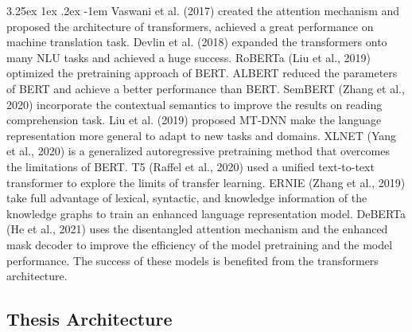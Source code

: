 \documentclass[12pt]{article}
\makeatletter
\renewcommand\paragraph{\@startsection{paragraph}{5}{\z@}%
  {3.25ex \@plus1ex \@minus.2ex}%
  {-1em}%
  {\normalfont\normalsize\bfseries}}
\makeatother
\begin{document}
\begin{CJK*}{UTF8}{bkai}
\begin{spacing}{1.77}
\paragraph{}
Vaswani et al. (2017)\cite{vaswani2017attention} created the attention mechanism and proposed the architecture of transformers, achieved a great performance on machine translation task. Devlin et al. (2018)\cite{devlin2018bert} expanded the transformers onto many NLU tasks and achieved a huge success. RoBERTa (Liu et al., 2019)\cite{liu2019roberta} optimized the pretraining approach of BERT. ALBERT \cite{lan2020albert} reduced the parameters of BERT and achieve a better performance than BERT. SemBERT (Zhang et al., 2020)\cite{zhang2020sembert} incorporate the contextual semantics to improve the results on reading comprehension task. Liu et al. (2019)\cite{liu2019mtdnn} proposed MT-DNN make the language representation more general to adapt to new tasks and domains. XLNET (Yang et al., 2020)\cite{yang2020xlnet} is a generalized autoregressive pretraining method that overcomes the limitations of BERT. T5 (Raffel et al., 2020)\cite{raffel2020t5} used a unified text-to-text transformer to explore the limits of transfer learning. ERNIE (Zhang et al., 2019)\cite{zhang2019ernie} take full advantage of lexical, syntactic, and knowledge information of the knowledge graphs to train an enhanced language representation model. DeBERTa (He et al., 2021)\cite{he2021deberta} uses the disentangled attention mechanism and the enhanced mask decoder to improve the efficiency of the model pretraining and the model performance. The success of these models is benefited from the transformers architecture.

\subsection{Thesis Architecture}

\end{spacing}
\end{CJK*}
\end{document}
